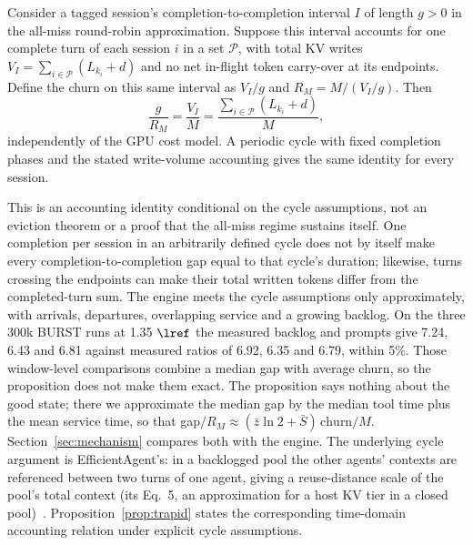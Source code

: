 \begin{proposition}\label{prop:trapid}
Consider a tagged session's completion-to-completion interval $I$ of length $g>0$ in the all-miss round-robin approximation. Suppose this interval accounts for one complete turn of each session $i$ in a set $\mathcal P$, with total KV writes $V_I=\sum_{i\in\mathcal P}(L_{k_i}+d)$ and no net in-flight token carry-over at its endpoints. Define the churn on this same interval as $V_I/g$ and $R_M=M/(V_I/g)$. Then
\[
\frac{g}{R_M}=\frac{V_I}{M}
=\frac{\sum_{i\in\mathcal P}(L_{k_i}+d)}{M},
\]
independently of the GPU cost model. A periodic cycle with fixed completion phases and the stated write-volume accounting gives the same identity for every session.
\end{proposition}
\noindent This is an accounting identity conditional on the cycle assumptions, not an eviction theorem or a proof that the all-miss regime sustains itself. One completion per session in an arbitrarily defined cycle does not by itself make every completion-to-completion gap equal to that cycle's duration; likewise, turns crossing the endpoints can make their total written tokens differ from the completed-turn sum. The engine meets the cycle assumptions only approximately, with arrivals, departures, overlapping service and a growing backlog. On the three 300k BURST runs at 1.35 $\lref$ the measured backlog and prompts give 7.24, 6.43 and 6.81 against measured ratios of 6.92, 6.35 and 6.79, within 5\%. Those window-level comparisons combine a median gap with average churn, so the proposition does not make them exact. The proposition says nothing about the good state; there we approximate the median gap by the median tool time plus the mean service time, so that gap$/R_M\approx(\bar z\ln 2+\bar S)\,\text{churn}/M$. Section~\ref{sec:mechanism} compares both with the engine. The underlying cycle argument is EfficientAgent's: in a backlogged pool the other agents' contexts are referenced between two turns of one agent, giving a reuse-distance scale of the pool's total context (its Eq.~5, an approximation for a host KV tier in a closed pool)~\citep{shao2026efficientagent}. Proposition~\ref{prop:trapid} states the corresponding time-domain accounting relation under explicit cycle assumptions.

